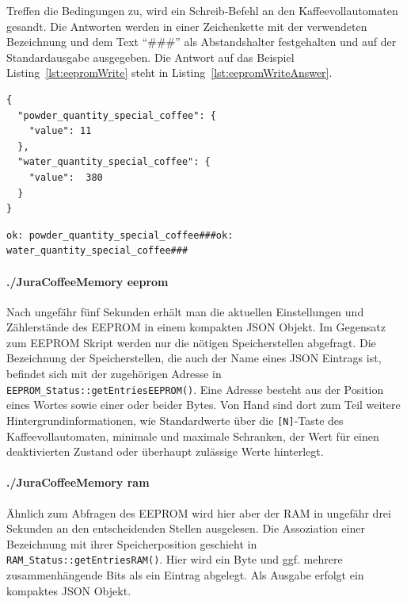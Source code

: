 Treffen die Bedingungen zu, wird ein Schreib-Befehl an den Kaffeevollautomaten gesandt.
Die Antworten werden in einer Zeichenkette mit der verwendeten Bezeichnung und dem Text "`\#\#\#"' als Abstandshalter festgehalten und auf der Standardausgabe ausgegeben.
Die Antwort auf das Beispiel Listing~\ref{lst:eepromWrite} steht in Listing~\ref{lst:eepromWriteAnswer}.

\begin{lstlisting}[label=lst:eepromWrite,caption={Beispiel einer JSON Eingabe für./JuraCoffeeMemory eepromWrite}]
{
  "powder_quantity_special_coffee": {
    "value": 11
  },
  "water_quantity_special_coffee": {
    "value":  380
  }
}
\end{lstlisting}

\begin{lstlisting}[label=lst:eepromWriteAnswer,caption={Antwort auf das Beispiel der JSON Eingabe}]
ok: powder_quantity_special_coffee###ok: water_quantity_special_coffee###
\end{lstlisting}

\paragraph{./JuraCoffeeMemory eeprom}
Nach ungefähr fünf Sekunden erhält man die aktuellen Einstellungen und Zählerstände des \ac{EEPROM} in einem kompakten \ac{JSON} Objekt.
Im Gegensatz zum EEPROM Skript werden nur die nötigen Speicherstellen abgefragt.
Die Bezeichnung der Speicherstellen, die auch der Name eines \ac{JSON} Eintrags ist, befindet sich mit der zugehörigen Adresse in \texttt{EEPROM\_Status::getEntriesEEPROM()}.
Eine Adresse besteht aus der Position eines Wortes sowie einer oder beider Bytes.
Von Hand sind dort zum Teil weitere Hintergrundinformationen, wie Standardwerte über die \texttt{[N]}-Taste des Kaffeevollautomaten, minimale und maximale Schranken, der Wert für einen deaktivierten Zustand oder überhaupt zulässige Werte hinterlegt.

\paragraph{./JuraCoffeeMemory ram}
Ähnlich zum Abfragen des \ac{EEPROM} wird hier aber der \ac{RAM} in ungefähr drei Sekunden an den entscheidenden Stellen ausgelesen.
Die Assoziation einer Bezeichnung mit ihrer Speicherposition geschieht in \texttt{RAM\_Status::getEntriesRAM()}.
Hier wird ein Byte und ggf. mehrere zusammenhängende Bits als ein Eintrag abgelegt.
Als Ausgabe erfolgt ein kompaktes \ac{JSON} Objekt.

